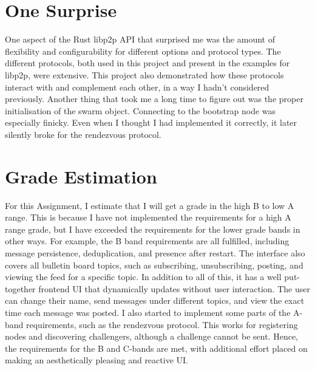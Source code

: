 \documentclass{article}
\begin{document}
\section{One Surprise}


One aspect of the Rust libp2p API that surprised me was the amount of flexibility and configurability for different options
and protocol types.
The different protocols, both used in this project and present in the examples for libp2p, were extensive.
This project also demonstrated how these protocols interact with and complement each other, in a way I hadn't considered previously.
Another thing that took me a long time to figure out was the proper initialisation of the swarm object.
Connecting to the bootstrap node was especially
finicky. Even when I thought I
had implemented it correctly, it later silently broke for the rendezvous protocol.



\section{Grade Estimation}

For this Assignment, I estimate that I will get a grade in the high B to low A range.
This is because I have not implemented the requirements for a high A range grade, but I have exceeded the requirements for the lower grade bands in other ways.
For example, the B band requirements are all fulfilled, including message persistence, deduplication, and presence after restart. 
The interface also covers all bulletin board topics, such as subscribing, unsubscribing, posting, and viewing the feed for a specific topic.
In addition to all of this, it has a well put-together frontend UI that dynamically updates without user interaction.
The user can change their name, send messages under different topics, and view the exact time each message was posted.
I also started to implement some parts of the A-band requirements, such as the rendezvous protocol. 
This works for registering nodes and discovering challengers, although a challenge cannot be sent.
Hence, the requirements for the B and C-bands are met, with additional effort placed on making an aesthetically pleasing and reactive UI.
\end{document}
